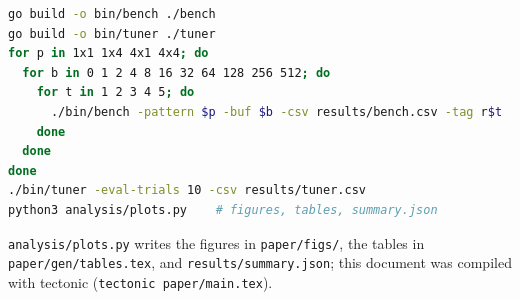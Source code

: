 \documentclass[10pt,a4paper]{article}
\begin{document}
\begin{lstlisting}[language=bash]
go build -o bin/bench ./bench
go build -o bin/tuner ./tuner
for p in 1x1 1x4 4x1 4x4; do
  for b in 0 1 2 4 8 16 32 64 128 256 512; do
    for t in 1 2 3 4 5; do
      ./bin/bench -pattern $p -buf $b -csv results/bench.csv -tag r$t
    done
  done
done
./bin/tuner -eval-trials 10 -csv results/tuner.csv
python3 analysis/plots.py    # figures, tables, summary.json
\end{lstlisting}

\texttt{analysis/plots.py} writes the figures in \texttt{paper/figs/}, the
tables in \texttt{paper/gen/tables.tex}, and \texttt{results/summary.json};
this document was compiled with tectonic (\texttt{tectonic paper/main.tex}).



\end{document}
